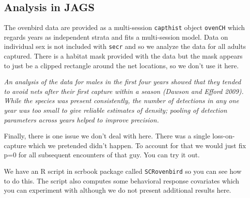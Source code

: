 \subsection{Analysis in JAGS}

The ovenbird data are provided as a multi-session \mbox{\tt capthist}
object \mbox{\tt ovenCH} which regards years as independent strata and
fits a multi-session model. Data on individual sex is not included
with \mbox{\tt secr} and so we analyze the data for all adults captured. 
There is a habitat mask provided with the data but the mask appears to
just be a clipped rectangle around the net locations, so we don't use
it here. 

{\it
  An analysis of the data for males in the first four years showed
  that they tended to avoid nets after their first capture within a
  season (Dawson and Efford 2009). While the species was present
  consistently, the number of detections in any one year was too small
  to give reliable estimates of density; pooling of detection
  parameters across years helped to improve precision.  
}

Finally, there is one issue we don't deal with here. There was a single
loss-on-capture which we pretended didn't happen. To account for that
we would just fix p=0 for all subsequent encounters of that guy. You
can try it out.

We have an R script in scrbook package called \mbox{\tt SCRovenbird}
so you can see how to do this. The script also computes some
behavioral response covariates which you can experiment with although
we do not present additional results here.



